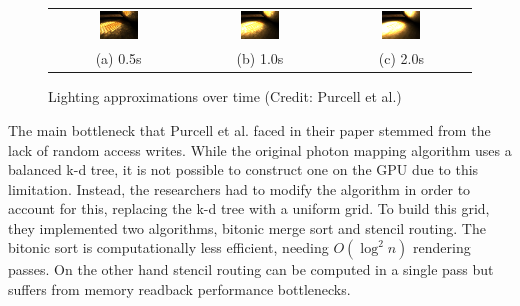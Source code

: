 \begin{figure}[ht]
    \centering
    \begin{tabular}{ccc}
        \includegraphics[width=0.3\textwidth]{img/half-second-glass-ball.png} & \includegraphics[width=0.3\textwidth]{img/one-second-glass-ball.png} & \includegraphics[width=0.3\textwidth]{img/two-second-glass-ball.png} \\
        (a) 0.5s                                                              & (b) 1.0s                                                             & (c) 2.0s
    \end{tabular}
    \captionsetup{justification=centering}
    \caption{Lighting approximations over time (Credit: Purcell et al.)}
    \label{fig:lighting-approximations}
\end{figure}

The main bottleneck that Purcell et al. faced in their paper stemmed from the lack of random access writes. While the original photon mapping algorithm uses a balanced k-d tree, it is not possible to construct one on the GPU due to this limitation. Instead, the researchers had to modify the algorithm in order to account for this, replacing the k-d tree with a uniform grid. To build this grid, they implemented two algorithms, bitonic merge sort and stencil routing. The bitonic sort is computationally less efficient, needing \(O(\log^2 n)\) rendering passes. On the other hand stencil routing can be computed in a single pass but suffers from memory readback performance bottlenecks.

